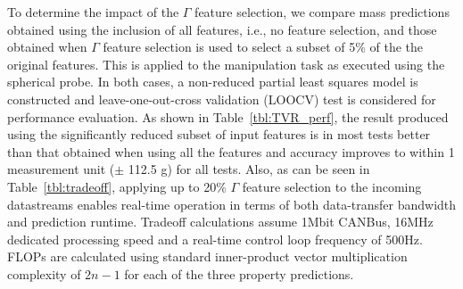 




To determine the impact of the $\Gamma$ feature selection, we compare mass predictions obtained using the inclusion of all features, i.e., no feature selection, and those obtained when $\Gamma$ feature selection is used to select a subset of 5\% of the the original features.
This is applied to the manipulation task as executed using the spherical probe.
In both cases, a non-reduced partial least squares model is constructed and leave-one-out-cross validation (LOOCV) test is considered for performance evaluation.
As shown in Table~\ref{tbl:TVR_perf}, the result produced using the significantly reduced subset of input features is in most tests better than that obtained when using all the features and accuracy improves to within 1 measurement unit ($\pm$ 112.5 g) for all tests.
Also, as can be seen in Table~\ref{tbl:tradeoff}, applying up to 20\% $\Gamma$ feature selection to the incoming datastreams enables real-time operation in terms of both data-transfer bandwidth and prediction runtime.
Tradeoff calculations assume 1Mbit CANBus, 16MHz dedicated processing speed and a real-time control loop frequency of 500Hz. FLOPs are calculated using standard inner-product vector multiplication complexity of $2n-1$ for each of the three property predictions.

